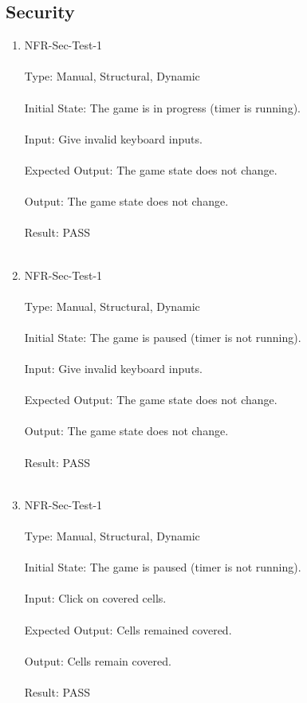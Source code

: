 \documentclass[12pt, titlepage]{article}
\begin{document}
\subsection{Security}
\begin{enumerate}

\item{NFR-Sec-Test-1\\\\}
Type: Manual, Structural, Dynamic\\\\				
Initial State: The game is in progress (timer is running).\\\\
Input: Give invalid keyboard inputs.\\\\					
Expected Output: The game state does not change. \\\\
Output: The game state does not change. \\\\
Result: PASS\\\\

\item{NFR-Sec-Test-1\\\\}
Type: Manual, Structural, Dynamic\\\\				
Initial State: The game is paused (timer is not running).\\\\
Input: Give invalid keyboard inputs.\\\\					
Expected Output: The game state does not change. \\\\
Output: The game state does not change. \\\\
Result: PASS\\\\

\newpage
\item{NFR-Sec-Test-1\\\\}
Type: Manual, Structural, Dynamic\\\\				
Initial State: The game is paused (timer is not running).\\\\
Input: Click on covered cells.\\\\					
Expected Output: Cells remained covered. \\\\
Output: Cells remain covered. \\\\
Result: PASS\\\\


\end{enumerate}
\end{document}

